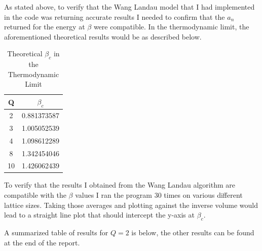 \documentclass[10pt,a4paper]{article}
\begin{document}
As stated above, to verify that the Wang Landau model that I had implemented in the code was returning accurate results I needed to confirm that the $a_n$ returned for the energy at $\beta$ were compatible.
In the thermodynamic limit, the aforementioned theoretical results would be as described below.

\begin{table}[h]
\centering
\begin{tabular}{|c|c|}
\hline
Q & $\beta_c$ \\ \hline
2 & 0.881373587 \\ \hline
3 & 1.005052539 \\ \hline
4 & 1.098612289 \\ \hline
8 & 1.342454046 \\ \hline
10 & 1.426062439 \\ \hline
\end{tabular}
\caption{Theoretical $\beta_c$ in the Thermodynamic Limit}
\end{table}

To verify that the results I obtained from the Wang Landau algorithm are compatible with the $\beta$ values I ran the program $30$ times on various different lattice sizes.
Taking those averages and plotting against the inverse volume would lead to a straight line plot that should intercept the y-axis at $\beta_c$.

A summarized table of results for $Q=2$ is below, the other results can be found at the end of the report.
\end{document}
